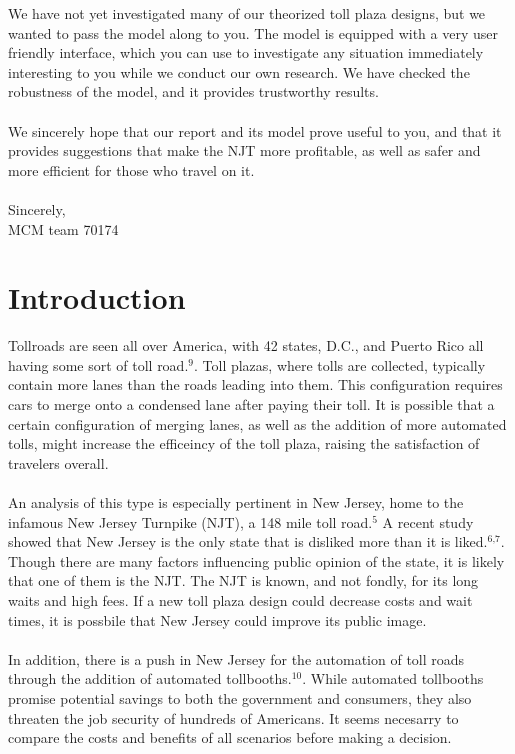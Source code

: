\documentclass{article}
\begin{document}
We have not yet investigated many of our theorized toll plaza designs, but we wanted to pass the model along to you. The model is equipped with a very user friendly interface, which you can use to investigate any situation immediately interesting to you while we conduct our own research. We have checked the robustness of the model, and it provides trustworthy results. \\ \\
We sincerely hope that our report and its model prove useful to you, and that it provides suggestions that make the NJT more profitable, as well as safer and more efficient for those who travel on it. \\
\\
Sincerely,\\
MCM team 70174

\newpage

\setlength\parindent{0pt}

\section{Introduction}

Tollroads are seen all over America, with 42 states, D.C., and Puerto Rico all having some sort of toll road.$^{\text{9}}$. Toll plazas, where tolls are collected, typically contain more lanes than the roads leading into them. This configuration requires cars to merge onto a condensed lane after paying their toll. It is possible that a certain configuration of merging lanes, as well as the addition of more automated tolls, might increase the efficeincy of the toll plaza, raising the satisfaction of travelers overall.\\ \\
An analysis of this type is especially pertinent in New Jersey, home to the infamous New Jersey Turnpike (NJT), a 148 mile toll road.$^{\text{5}}$ A recent study showed that New Jersey is the only state that is disliked more than it is liked.$^{\text{6,7}}$. Though there are many factors influencing public opinion of the state, it is likely that one of them is the NJT. The NJT is known, and not fondly, for its long waits and high fees. If a new toll plaza design could decrease costs and wait times, it is possbile that New Jersey could improve its public image.\\ \\
In addition, there is a push in New Jersey for the automation of toll roads through the addition of automated tollbooths.$^{\text{10}}$. While automated tollbooths promise potential savings to both the government and consumers, they also threaten the job security of hundreds of Americans. It seems necesarry to compare the costs and benefits of all scenarios before making a decision.
\end{document}
